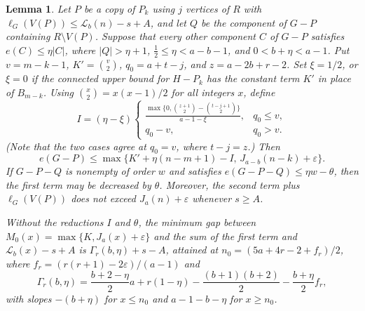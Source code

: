 \documentclass[10pt]{article}
\theoremstyle{compactplain}
\newtheorem{lemma}[theorem]{Lemma}
\theoremstyle{remark}\newtheorem{remark}[theorem]{Remark}
\begin{document}
\begin{lemma}\label{lem:residual}
Let $P$ be a copy of $P_k$ using $j$ vertices of $R$ with
$\ell_G(V(P))\le\mathcal{L}_b(n)-s+A$, and let $Q$ be the component of
$G-P$ containing $R\setminus V(P)$. Suppose that every other component
$C$ of $G-P$ satisfies $e(C)\le\eta|C|$, where $|Q|>\eta+1$,
$\tfrac{1}{2}\le\eta<a-b-1$, and $0<b+\eta<a-1$. Put $v=m-k-1$,
$K'=\binom{v}{2}$, $q_0=a+t-j$, and $z=a-2b+r-2$. Set $\xi=1/2$, or
$\xi=0$ if the connected upper bound for $H-P_k$ has the constant term
$K'$ in place of $B_{m-k}$. Using $\binom{x}{2}=x(x-1)/2$ for all
integers $x$, define
\[
 I=(\eta-\xi)
 \begin{cases}
  \displaystyle\frac{\max\bigl\{0,\binom{z+1}{2}-\binom{t-j+1}{2}\bigr\}}{a-1-\xi},
   & q_0\le v,\\[7pt]
  q_0-v, & q_0>v.
 \end{cases}
\]
(Note that the two cases agree at $q_0=v$, where $t-j=z$.) Then
\[
 e(G-P)\le\max\bigl\{K'+\eta(n-m+1)-I,\,J_{a-b}(n-k)+\varepsilon\bigr\}.
\]
If $G-P-Q$ is nonempty of order $w$ and satisfies
$e(G-P-Q)\le\eta w-\theta$, then the first term may be decreased by
$\theta$. Moreover, the second term plus $\ell_G(V(P))$ does not exceed
$J_a(n)+\varepsilon$ whenever $s\ge A$.

Without the reductions $I$ and $\theta$, the minimum gap between
$M_0(x)=\max\{K,J_a(x)+\varepsilon\}$ and the sum of the first term and
$\mathcal{L}_b(x)-s+A$ is $\Gamma_r(b,\eta)+s-A$, attained at
$n_0=(5a+4r-2+f_r)/2$, where $f_r=(r(r+1)-2\varepsilon)/(a-1)$ and
\begin{equation}\label{eq:gamma}
 \Gamma_r(b,\eta)=\frac{b+2-\eta}{2}a+r(1-\eta)
 -\frac{(b+1)(b+2)}{2}-\frac{b+\eta}{2}f_r,
\end{equation}
with slopes $-(b+\eta)$ for $x\le n_0$ and $a-1-b-\eta$ for $x\ge n_0$.
\end{lemma}
\end{document}
